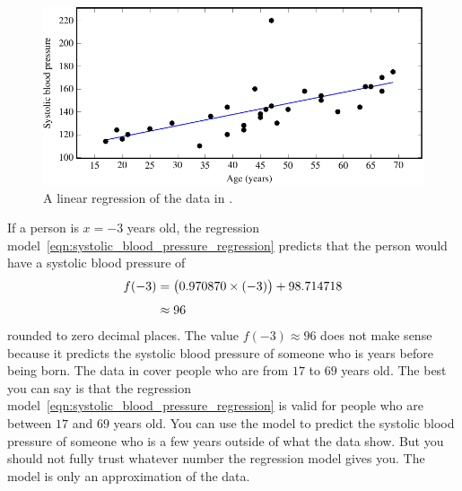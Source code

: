 \documentclass[a4paper,oneside,12pt]{article}
\begin{document}
\begin{solution}
\begin{figure}[!htbp]
\centering
\includegraphics[scale=1]{image/07/blood-pressure-regression.pdf}
\caption{%
  A linear regression of the data in .
}
\label{fig:blood_pressure_regression}
\end{figure}

If a person is $x = -3$ years old, the regression
model~\eqref{eqn:systolic_blood_pressure_regression} predicts that the
person would have a systolic blood pressure of
\begin{align*}
f(-3)
&=
\big(0.970870 \times (-3)\big) + 98.714718 \\[4pt]
&\approx
96
\end{align*}
rounded to zero decimal places.  The value $f(-3) \approx 96$ does not
make sense because it predicts the systolic blood pressure of someone
who is years before being born.  The data in
 cover people who are from $17$ to $69$
years old.  The best you can say is that the regression
model~\eqref{eqn:systolic_blood_pressure_regression} is valid for
people who are between $17$ and $69$ years old.  You can use the model
to predict the systolic blood pressure of someone who is a few years
outside of what the data show.  But you should not fully trust
whatever number the regression model gives you.  The model is only an
approximation of the data.
\end{solution}
\end{document}
